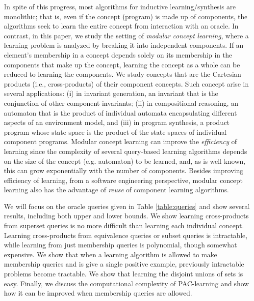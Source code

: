 In spite of this progress,
most algorithms for inductive learning/synthesis are monolithic; that is, even
if the concept (program) is made up of components, the algorithms seek to
learn the entire concept from interaction with an oracle.
In contrast, in this paper, we study the setting of {\em modular concept learning},
where a learning problem is analyzed by breaking it into independent components. 
If an element's membership in a concept depends solely on its membership in the 
components that make up the concept, 
learning the concept as a whole can be reduced to learning the components. 
We study concepts that are the Cartesian products (i.e., cross-products) of their 
component concepts. Such concept arise in several applications: 
(i) in invariant generation, an invariant that is the conjunction of other component
invariants;
(ii) in compositional reasoning, an automaton that is the product of individual automata encapsulating different aspects of an environment model, and
(iii) in program synthesis, a product program whose state space is the product of the state spaces of individual component programs.
Modular concept learning can improve the {\em efficiency} of learning since the complexity of several
query-based learning algorithms depends on the size of the concept (e.g. automaton) to
be learned, and, as is well known, this can grow exponentially with the number of components.
Besides improving efficiency of learning, from a software engineering perspective,
modular concept learning also has the
advantage of {\em reuse} of component learning algorithms.

We will focus on the oracle queries given in Table \ref{table:queries} and show several results, including both upper and lower bounds. 
We show learning cross-products from superset queries is no more difficult than learning each individual concept. 
Learning cross-products from equivalence queries or subset queries is intractable, while learning from just membership queries is polynomial, though somewhat expensive. 
We show that when a learning algorithm is allowed to make membership queries and is give a single positive example, previously intractable problems become tractable. 
We show that learning the disjoint unions of sets is easy.
Finally, we discuss the computational complexity of PAC-learning and show how it can be improved when membership queries are allowed. 

